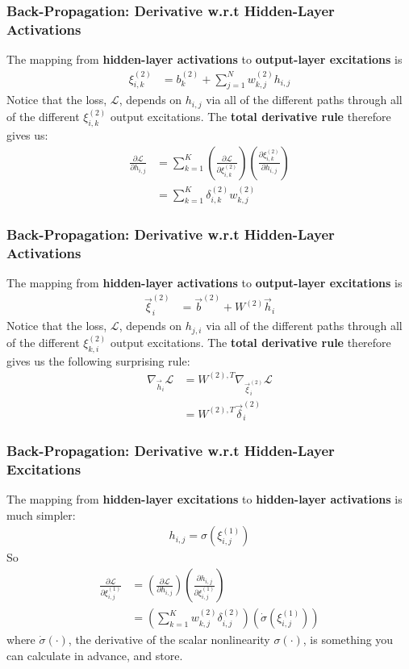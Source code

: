 \documentclass{beamer}
\begin{document}
\begin{frame}
  \frametitle{Back-Propagation: Derivative w.r.t Hidden-Layer Activations}

  The mapping from {\bf hidden-layer activations} to {\bf output-layer excitations} is 
  \begin{align*}
    \xi_{i,k}^{(2)} &=b_k^{(2)} + \sum_{j=1}^Nw_{k,j}^{(2)} h_{i,j}
  \end{align*}
  Notice that the loss, ${\mathcal L}$, depends on $h_{i,j}$ via all
  of the different paths through all of the different
  $\xi_{i,k}^{(2)}$ output excitations.  The {\bf total derivative
    rule} therefore gives us:
  \begin{align*}
    \frac{\partial\mathcal L}{\partial h_{i,j}} &=
    \sum_{k=1}^K\left(\frac{\partial\mathcal L}{\partial\xi_{i,k}^{(2)}}\right)
    \left(\frac{\partial\xi_{i,k}^{(2)}}{\partial h_{i,j}}\right)\\
    &=    \sum_{k=1}^K\delta_{i,k}^{(2)} w_{k,j}^{(2)}
  \end{align*}
\end{frame}

\begin{frame}
  \frametitle{Back-Propagation: Derivative w.r.t Hidden-Layer Activations}

  The mapping from {\bf hidden-layer activations} to {\bf output-layer excitations} is 
  \begin{align*}
    \vec\xi_i^{(2)} &=\vec{b}^{(2)} + W^{(2)}\vec{h}_i
  \end{align*}
  Notice that the loss, ${\mathcal L}$, depends on $h_{j,i}$ via all
  of the different paths through all of the different
  $\xi_{k,i}^{(2)}$ output excitations.  The {\bf total derivative
    rule} therefore gives us the following surprising rule:
  \begin{align*}
    \nabla_{\vec{h}_i}{\mathcal L}     &= W^{(2),T} \nabla_{\vec\xi_i^{(2)}}{\mathcal L}\\
    &= W^{(2),T} \vec\delta_i^{(2)}
  \end{align*}
\end{frame}

\begin{frame}
  \frametitle{Back-Propagation: Derivative w.r.t Hidden-Layer Excitations}

  The mapping from {\bf hidden-layer excitations} to {\bf hidden-layer activations} is
  much simpler:
  \begin{align*}
    h_{i,j} = \sigma(\xi_{i,j}^{(1)})
  \end{align*}
  So
  \begin{align*}
    \frac{\partial\mathcal L}{\partial \xi_{i,j}^{(1)}} &=
    \left(\frac{\partial\mathcal L}{\partial h_{i,j}}\right)
    \left(\frac{\partial h_{i,j}}{\partial \xi_{i,j}^{(1)}}\right)\\
    &=
    \left(\sum_{k=1}^K w_{k,j}^{(2)}\delta_{i,j}^{(2)}\right)
    \left(\dot\sigma\left(\xi_{i,j}^{(1)}\right)\right)
  \end{align*}
  where $\dot\sigma(\cdot)$, the derivative of the scalar nonlinearity
  $\sigma(\cdot)$, is something you can calculate in advance, and store.
\end{frame}
\end{document}
